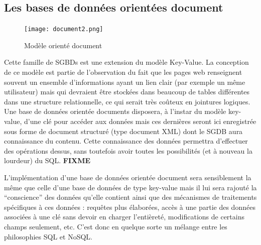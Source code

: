 \documentclass[11pt]{article}
\begin{document}
\subsection{Les bases de données orientées document}
\begin{figure}[H]
  \centering
  \begin{center}
    \texttt{[image: document2.png]}
  \end{center}
  \caption{Modèle orienté document\cite{tourhorizon}}
\end{figure}
Cette famille de SGBDs est une extension du modèle Key-Value. La conception de ce modèle est partie de l'observation du  fait que les pages web renseignent souvent un ensemble d'informations ayant un lien clair (par exemple un même utilisateur) mais qui devraient être stockées dans beaucoup de tables différentes dans une structure relationnelle, ce qui serait très coûteux en jointures logiques. Une base de données orientée documents disposera, à l'instar du modèle key-value, d'une clé pour accéder aux données mais ces dernières seront ici enregistrée sous forme de  document structuré (type document XML) dont le SGDB aura connaissance du contenu. Cette connaissance des données permettra d'effectuer des opérations dessus, sans toutefois avoir toutes les possibilités (et à nouveau la lourdeur) du SQL. \colorbox{BrickRed}{\textbf{FIXME}}

L'implémentation d'une base de données orientée document sera sensiblement la même que celle d'une base de données de type key-value mais il lui sera rajouté la ``conscience'' des données qu'elle contient ainsi que des mécanismes de traitements spécifiques à ces données : requêtes plus élaborées, accès à une partie des données associées à une clé sans devoir en charger l'entièreté, modifications de certains champs seulement, etc. C'est donc en quelque sorte un mélange entre les philosophies SQL et NoSQL.
\end{document}
